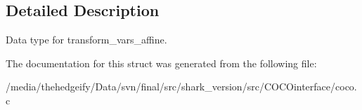 \subsection{Detailed Description}
Data type for transform\+\_\+vars\+\_\+affine. 

The documentation for this struct was generated from the following file\+:\begin{DoxyCompactItemize}
\item 
/media/thehedgeify/\+Data/svn/final/src/shark\+\_\+version/src/\+C\+O\+C\+Ointerface/coco.\+c\end{DoxyCompactItemize}
